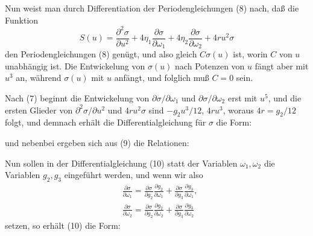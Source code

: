 
Nun weist man durch Differentiation der Periodengleichungen
(8) nach, daß die Funktion
\[
S(u) = \frac{\partial^2 \sigma}{\partial u^2} + 4\eta_1\frac{\partial \sigma}{\partial \omega_1} + 4\eta_2\frac{\partial \sigma}{\partial \omega_2} + 4ru^2\sigma
\]
den Periodengleichungen (8) genügt, und also gleich $C\sigma(u)$ ist,
worin $C$ von $u$ unabhängig ist. Die Entwickelung von $\sigma(u)$ nach %
Potenzen von $u$ fängt aber mit $u^3$ an, während $\sigma(u)$ mit $u$ anfängt,
und folglich muß $C=0$ sein.

Nach (7) beginnt die Entwickelung von $\partial\sigma/\partial\omega_1$ und $\partial\sigma/\partial\omega_2$
erst mit $u^5$, und die ersten Glieder von $\partial^2\sigma/\partial u^2$ und $4ru^2\sigma$ sind
$-g_2u^3/12$, $4ru^3$, woraus $4r=g_2/12$ folgt, und demnach erhält
die Differentialgleichung für $\sigma$ die Form:


und nebenbei ergeben sich aus (9) die Relationen:


Nun sollen in der Differentialgleichung (10) statt der Variablen
$\omega_1, \omega_2$ die Variablen $g_2, g_3$ eingeführt werden, und wenn wir also
\[
\begin{aligned}
&\frac{\partial \sigma}{\partial \omega_1} = \frac{\partial \sigma}{\partial g_2}\frac{\partial g_2}{\partial \omega_1} + \frac{\partial \sigma}{\partial g_3}\frac{\partial g_3}{\partial \omega_1}, \\
&\frac{\partial \sigma}{\partial \omega_2} = \frac{\partial \sigma}{\partial g_2}\frac{\partial g_2}{\partial \omega_2} + \frac{\partial \sigma}{\partial g_3}\frac{\partial g_3}{\partial \omega_2}
\end{aligned}
\]
setzen, so erhält (10) die Form:

